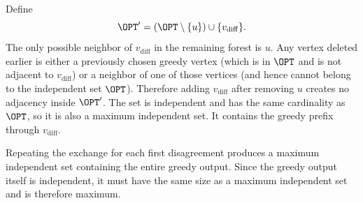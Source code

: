 \documentclass[11pt,addpoints,answers]{exam}
\begin{document}
\begin{questions}
\begin{parts}
\begin{solution}
    Define
    \[
       \OPT'=(\OPT\setminus\{u\})\cup\{v_{\mathrm{diff}}\}.
    \]
    The only possible neighbor of $v_{\mathrm{diff}}$ in the remaining
    forest is $u$.  Any vertex deleted earlier is either a previously chosen
    greedy vertex (which is in $\OPT$ and is not adjacent to
    $v_{\mathrm{diff}}$) or a neighbor of one of those vertices (and hence
    cannot belong to the independent set $\OPT$).  Therefore adding
    $v_{\mathrm{diff}}$ after removing $u$ creates no adjacency inside
    $\OPT'$.  The set is independent and has the same cardinality as $\OPT$,
    so it is also a maximum independent set.  It contains the greedy prefix
    through $v_{\mathrm{diff}}$.

    Repeating the exchange for each first disagreement produces a maximum
    independent set containing the entire greedy output.  Since the greedy
    output itself is independent, it must have the same size as a maximum
    independent set and is therefore maximum.
    \end{solution}
  \end{parts}

\end{questions}
\end{document}
